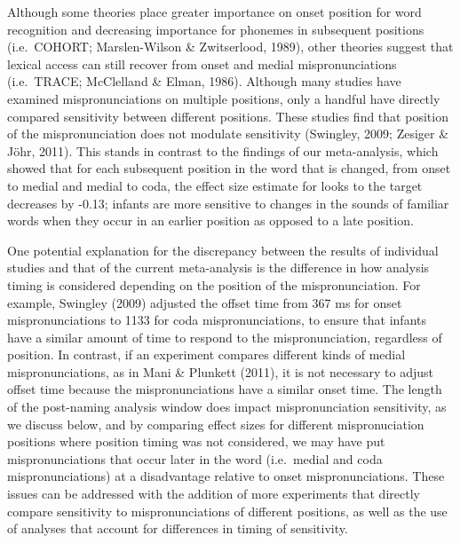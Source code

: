 \documentclass[man]{apa6}
\theoremstyle{definition}
\theoremstyle{definition}
\theoremstyle{definition}
\theoremstyle{remark}
\begin{document}
Although some theories place greater importance on onset position for
word recognition and decreasing importance for phonemes in subsequent
positions (i.e.~COHORT; Marslen-Wilson \& Zwitserlood, 1989), other
theories suggest that lexical access can still recover from onset and
medial mispronunciations (i.e.~TRACE; McClelland \& Elman, 1986).
Although many studies have examined mispronunciations on multiple
positions, only a handful have directly compared sensitivity between
different positions. These studies find that position of the
mispronunciation does not modulate sensitivity (Swingley, 2009; Zesiger
\& Jöhr, 2011). This stands in contrast to the findings of our
meta-analysis, which showed that for each subsequent position in the
word that is changed, from onset to medial and medial to coda, the
effect size estimate for looks to the target decreases by -0.13; infants
are more sensitive to changes in the sounds of familiar words when they
occur in an earlier position as opposed to a late position.

One potential explanation for the discrepancy between the results of
individual studies and that of the current meta-analysis is the
difference in how analysis timing is considered depending on the
position of the mispronunciation. For example, Swingley (2009) adjusted
the offset time from 367 ms for onset mispronunciations to 1133 for coda
mispronunciations, to ensure that infants have a similar amount of time
to respond to the mispronunciation, regardless of position. In contrast,
if an experiment compares different kinds of medial mispronunciations,
as in Mani \& Plunkett (2011), it is not necessary to adjust offset time
because the mispronunciations have a similar onset time. The length of
the post-naming analysis window does impact mispronunciation
sensitivity, as we discuss below, and by comparing effect sizes for
different mispronuciation positions where position timing was not
considered, we may have put mispronunciations that occur later in the
word (i.e.~medial and coda mispronunciations) at a disadvantage relative
to onset mispronunciations. These issues can be addressed with the
addition of more experiments that directly compare sensitivity to
mispronunciations of different positions, as well as the use of analyses
that account for differences in timing of sensitivity.
\end{document}
